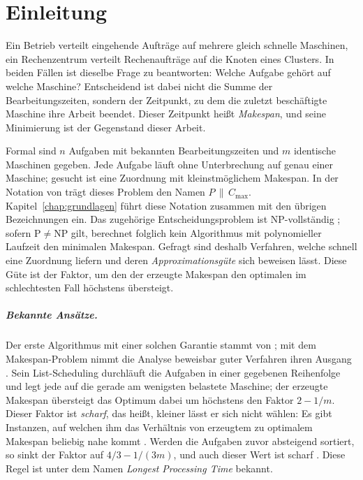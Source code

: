 \chapter{Einleitung}
\label{chap:einleitung}

Ein Betrieb verteilt eingehende Aufträge auf mehrere gleich schnelle Maschinen, ein Rechenzentrum
verteilt Rechenaufträge auf die Knoten eines Clusters.
In beiden Fällen ist dieselbe Frage zu beantworten: Welche Aufgabe gehört auf welche Maschine?
Entscheidend ist dabei nicht die Summe der Bearbeitungszeiten, sondern der Zeitpunkt, zu dem die
zuletzt beschäftigte Maschine ihre Arbeit beendet.
Dieser Zeitpunkt heißt \emph{Makespan}, und seine Minimierung ist der Gegenstand dieser Arbeit.

Formal sind $n$ Aufgaben mit bekannten Bearbeitungszeiten und $m$ identische Maschinen gegeben.
Jede Aufgabe läuft ohne Unterbrechung auf genau einer Maschine; gesucht ist eine Zuordnung mit
kleinstmöglichem Makespan.
In der Notation von \textcite{graham1979} trägt dieses Problem den Namen $P\,\|\,C_{\max}$.
Kapitel~\ref{chap:grundlagen} führt diese Notation zusammen mit den übrigen Bezeichnungen ein.
Das zugehörige Entscheidungsproblem ist NP-vollständig \cite{garey_johnson1979}; sofern
$\mathrm{P} \ne \mathrm{NP}$ gilt, berechnet folglich kein Algorithmus mit polynomieller Laufzeit
den minimalen Makespan.
Gefragt sind deshalb Verfahren, welche schnell eine Zuordnung liefern und deren
\emph{Approximationsgüte} sich beweisen lässt.
Diese Güte ist der Faktor, um den der erzeugte Makespan den optimalen im schlechtesten Fall
höchstens übersteigt.

\paragraph{Bekannte Ansätze.}
Der erste Algorithmus mit einer solchen Garantie stammt von \textcite{graham1966}; mit dem
Makespan-Problem nimmt die Analyse beweisbar guter Verfahren ihren Ausgang
\cite[S.~145]{hochbaum_shmoys_1987}.
Sein List-Scheduling durchläuft die Aufgaben in einer gegebenen Reihenfolge und legt jede auf
die gerade am wenigsten belastete Maschine; der erzeugte Makespan übersteigt das Optimum dabei um
höchstens den Faktor $2 - 1/m$.
Dieser Faktor ist \emph{scharf}, das heißt, kleiner lässt er sich nicht wählen: Es gibt
Instanzen, auf welchen ihm das Verhältnis von erzeugtem zu optimalem Makespan beliebig nahe
kommt \cite[S.~1571]{graham1966}.
Werden die Aufgaben zuvor absteigend sortiert, so sinkt der Faktor auf $4/3 - 1/(3m)$, und auch
dieser Wert ist scharf \cite[Theorem~2]{graham1969}.
Diese Regel ist unter dem Namen \emph{Longest Processing Time} bekannt.

